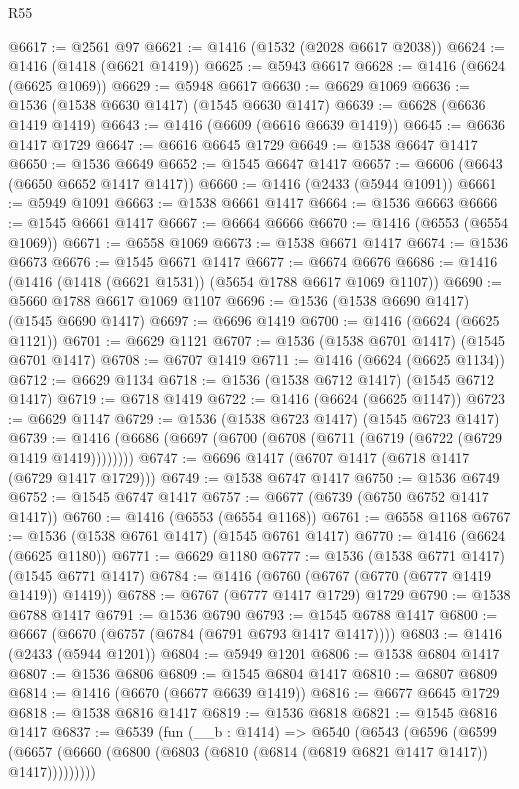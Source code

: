 \begin{lexlean}{R55}
\begin{coremodule}
{{@6617 := @2561 @97
@6621 := @1416 (@1532 (@2028 @6617 @2038))
@6624 := @1416 (@1418 (@6621 @1419))
@6625 := @5943 @6617
@6628 := @1416 (@6624 (@6625 @1069))
@6629 := @5948 @6617
@6630 := @6629 @1069
@6636 := @1536 (@1538 @6630 @1417) (@1545 @6630 @1417)
@6639 := @6628 (@6636 @1419 @1419)
@6643 := @1416 (@6609 (@6616 @6639 @1419))
@6645 := @6636 @1417 @1729
@6647 := @6616 @6645 @1729
@6649 := @1538 @6647 @1417
@6650 := @1536 @6649
@6652 := @1545 @6647 @1417
@6657 := @6606 (@6643 (@6650 @6652 @1417 @1417))
@6660 := @1416 (@2433 (@5944 @1091))
@6661 := @5949 @1091
@6663 := @1538 @6661 @1417
@6664 := @1536 @6663
@6666 := @1545 @6661 @1417
@6667 := @6664 @6666
@6670 := @1416 (@6553 (@6554 @1069))
@6671 := @6558 @1069
@6673 := @1538 @6671 @1417
@6674 := @1536 @6673
@6676 := @1545 @6671 @1417
@6677 := @6674 @6676
@6686 := @1416 (@1416 (@1418 (@6621 @1531)) (@5654 @1788 @6617 @1069 @1107))
@6690 := @5660 @1788 @6617 @1069 @1107
@6696 := @1536 (@1538 @6690 @1417) (@1545 @6690 @1417)
@6697 := @6696 @1419
@6700 := @1416 (@6624 (@6625 @1121))
@6701 := @6629 @1121
@6707 := @1536 (@1538 @6701 @1417) (@1545 @6701 @1417)
@6708 := @6707 @1419
@6711 := @1416 (@6624 (@6625 @1134))
@6712 := @6629 @1134
@6718 := @1536 (@1538 @6712 @1417) (@1545 @6712 @1417)
@6719 := @6718 @1419
@6722 := @1416 (@6624 (@6625 @1147))
@6723 := @6629 @1147
@6729 := @1536 (@1538 @6723 @1417) (@1545 @6723 @1417)
@6739 := @1416 (@6686 (@6697 (@6700 (@6708 (@6711 (@6719 (@6722 (@6729 @1419 @1419))))))))
@6747 := @6696 @1417 (@6707 @1417 (@6718 @1417 (@6729 @1417 @1729)))
@6749 := @1538 @6747 @1417
@6750 := @1536 @6749
@6752 := @1545 @6747 @1417
@6757 := @6677 (@6739 (@6750 @6752 @1417 @1417))
@6760 := @1416 (@6553 (@6554 @1168))
@6761 := @6558 @1168
@6767 := @1536 (@1538 @6761 @1417) (@1545 @6761 @1417)
@6770 := @1416 (@6624 (@6625 @1180))
@6771 := @6629 @1180
@6777 := @1536 (@1538 @6771 @1417) (@1545 @6771 @1417)
@6784 := @1416 (@6760 (@6767 (@6770 (@6777 @1419 @1419)) @1419))
@6788 := @6767 (@6777 @1417 @1729) @1729
@6790 := @1538 @6788 @1417
@6791 := @1536 @6790
@6793 := @1545 @6788 @1417
@6800 := @6667 (@6670 (@6757 (@6784 (@6791 @6793 @1417 @1417))))
@6803 := @1416 (@2433 (@5944 @1201))
@6804 := @5949 @1201
@6806 := @1538 @6804 @1417
@6807 := @1536 @6806
@6809 := @1545 @6804 @1417
@6810 := @6807 @6809
@6814 := @1416 (@6670 (@6677 @6639 @1419))
@6816 := @6677 @6645 @1729
@6818 := @1538 @6816 @1417
@6819 := @1536 @6818
@6821 := @1545 @6816 @1417
@6837 := @6539
    (fun (__b : @1414) =>
    @6540
      (@6543
        (@6596
          (@6599 (@6657 (@6660 (@6800 (@6803 (@6810 (@6814 (@6819 @6821 @1417 @1417)) @1417)))))))))
}}
\end{coremodule}
\end{lexlean}
